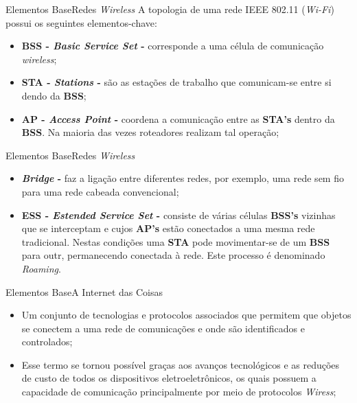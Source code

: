 \begin{frame}{Elementos Base}{Redes \textit{Wireless}}
    A topologia de uma rede IEEE 802.11 (\textit{Wi-Fi})  possui os seguintes elementos-chave:

    \begin{itemize}
        \item \textbf{BSS - \textit{Basic Service Set} -} corresponde a uma célula de comunicação \textit{wireless};
        \item \textbf{STA - \textit{Stations} -} são as estações de trabalho que comunicam-se entre si dendo da \textbf{BSS};
        \item \textbf{AP - \textit{Access Point} -} coordena a comunicação entre as \textbf{STA's} dentro da \textbf{BSS}. Na maioria das vezes roteadores realizam tal operação;
        
    \end{itemize}
    
\end{frame}

\begin{frame}{Elementos Base}{Redes \textit{Wireless}}
    \begin{itemize}
    \item \textbf{\textit{Bridge} -} faz a ligação entre diferentes redes, por exemplo, uma rede sem fio para uma rede cabeada convencional;
	\item  \textbf{ESS - \textit{Estended Service Set} -} consiste de várias células \textbf{BSS's} vizinhas que se interceptam e cujos \textbf{AP's} estão conectados a uma mesma rede tradicional. Nestas condições uma \textbf{STA} pode movimentar-se de um \textbf{BSS} para outr, permanecendo conectada à rede. Este processo é denominado \textit{Roaming}.
	\end{itemize}
\end{frame}

\begin{frame}{Elementos Base}{A Internet das Coisas}
    \begin{itemize}
        \item Um conjunto de tecnologias e protocolos associados que permitem que objetos se conectem a uma rede de comunicações e onde são identificados e controlados;
        \item Esse termo se tornou possível graças aos avanços tecnológicos e as reduções de custo de todos os dispositivos eletroeletrônicos, os quais possuem a capacidade de comunicação principalmente por meio de protocolos \textit{Wiress};
    \end{itemize}
    
\end{frame}

